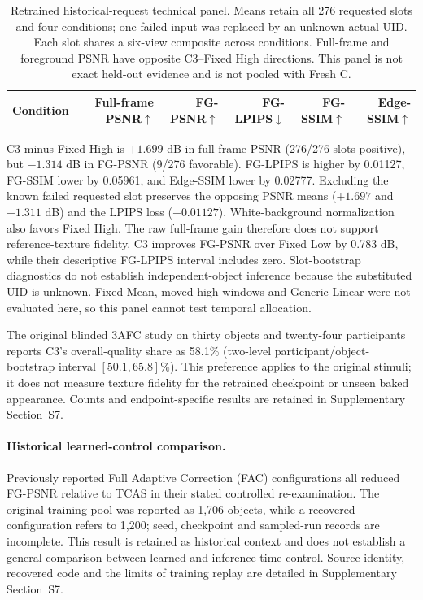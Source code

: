 \documentclass[times,twocolumn,final]{elsarticle}
\begin{document}
\begin{table}[t]
\centering\scriptsize\setlength{\tabcolsep}{5pt}
\caption{Retrained historical-request technical panel. Means retain all 276 requested slots and four conditions; one failed input was replaced by an unknown actual UID. Each slot shares a six-view composite across conditions. Full-frame and foreground PSNR have opposite C3--Fixed High directions. This panel is not exact held-out evidence and is not pooled with Fresh C.}
\label{tab:original276}
\begin{tabular}{lrrrrr}
\toprule Condition & Full-frame PSNR$\uparrow$ & FG-PSNR$\uparrow$ & FG-LPIPS$\downarrow$ & FG-SSIM$\uparrow$ & Edge-SSIM$\uparrow$ \\
\midrule

\bottomrule
\end{tabular}
\end{table}

C3 minus Fixed High is $+1.699$ dB in full-frame PSNR (276/276 slots positive), but $-1.314$ dB in FG-PSNR (9/276 favorable). FG-LPIPS is higher by 0.01127, FG-SSIM lower by 0.05961, and Edge-SSIM lower by 0.02777. Excluding the known failed requested slot preserves the opposing PSNR means ($+1.697$ and $-1.311$ dB) and the LPIPS loss ($+0.01127$). White-background normalization also favors Fixed High. The raw full-frame gain therefore does not support reference-texture fidelity. C3 improves FG-PSNR over Fixed Low by 0.783 dB, while their descriptive FG-LPIPS interval includes zero. Slot-bootstrap diagnostics do not establish independent-object inference because the substituted UID is unknown. Fixed Mean, moved high windows and Generic Linear were not evaluated here, so this panel cannot test temporal allocation.

The original blinded 3AFC study on thirty objects and twenty-four participants reports C3's overall-quality share as 58.1\% (two-level participant/object-bootstrap interval $[50.1,65.8]\%$). This preference applies to the original stimuli; it does not measure texture fidelity for the retrained checkpoint or unseen baked appearance. Counts and endpoint-specific results are retained in Supplementary Section~S7.

\paragraph{Historical learned-control comparison.}
\label{subsec:facreported}
Previously reported Full Adaptive Correction (FAC) configurations all reduced FG-PSNR relative to TCAS in their stated controlled re-examination. The original training pool was reported as 1,706 objects, while a recovered configuration refers to 1,200; seed, checkpoint and sampled-run records are incomplete. This result is retained as historical context and does not establish a general comparison between learned and inference-time control. Source identity, recovered code and the limits of training replay are detailed in Supplementary Section~S7.
\end{document}
